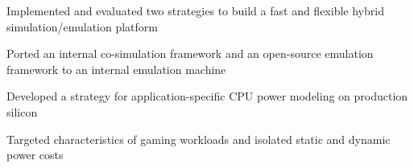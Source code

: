 \documentclass[]{deedy-resume-openfont}
\begin{document}
\begin{minipage}[t]{0.64\textwidth}
{\normalsize
\begin{tightemize}
\item Implemented and evaluated two strategies to build a fast and flexible hybrid simulation/emulation platform
\item Ported an internal co-simulation framework and an open-source emulation framework to an internal emulation machine
\end{tightemize}
}


\vspace{\topsep}
{\normalsize
\begin{tightemize}
\item Developed a strategy for application-specific CPU power modeling on production silicon
\item Targeted characteristics of gaming workloads and isolated static and dynamic power costs
\end{tightemize}
}
\smallsectionsep



\end{minipage}
\end{document}
